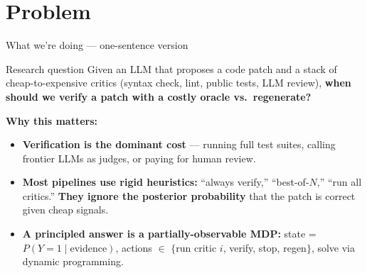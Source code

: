 \documentclass[10pt]{beamer}
\newcommand{\good}[1]{\textcolor{accentGreen}{\textbf{#1}}}
\newcommand{\bad}[1]{\textcolor{accentRed}{\textbf{#1}}}
\newcommand{\warn}[1]{\textcolor{accentOrange}{\textbf{#1}}}
\newcommand{\info}[1]{\textcolor{primaryBlue}{\textbf{#1}}}
\begin{document}

\section{Problem}
\hypertarget{out:1}{}

\begin{frame}{What we're doing --- one-sentence version}
\vspace{0.4cm}
\begin{block}{Research question}
Given an LLM that proposes a code patch and a stack of cheap-to-expensive
critics (syntax check, lint, public tests, LLM review), \textbf{when should we
verify a patch with a costly oracle vs.\ regenerate?}
\end{block}

\vspace{0.4cm}
\info{Why this matters:}
\begin{itemize}
\item \good{Verification is the dominant cost} --- running full test suites,
calling frontier LLMs as judges, or paying for human review.
\item \warn{Most pipelines use rigid heuristics:} ``always verify,''
``best-of-$N$,'' ``run all critics.'' \bad{They ignore the posterior
probability} that the patch is correct given cheap signals.
\item \info{A principled answer is a partially-observable MDP:}
state = $P(Y{=}1 \mid \text{evidence})$, actions $\in$
$\{$run critic $i$, verify, stop, regen$\}$, solve via dynamic programming.
\end{itemize}
\end{frame}
\end{document}
